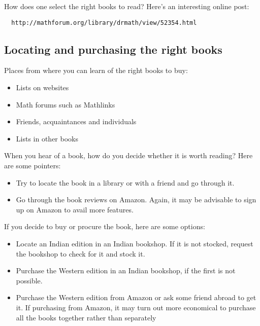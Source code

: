 \documentclass[a4paper]{amsart}
\begin{document}
How does one select the right books to read? Here's an interesting online post:

\begin{verbatim}
  http://mathforum.org/library/drmath/view/52354.html
\end{verbatim}

\subsection{Locating and purchasing the right books}

Places from where you can learn of the right books to buy:

\begin{itemize}

\item Lists on websites

\item Math forums such as Mathlinks

\item Friends, acquaintances and individuals

\item Lists in other books

\end{itemize}

When you hear of a  book, how do you decide whether it is worth reading? Here are some pointers:

\begin{itemize}

\item Try to locate the book in a library or with a friend and go through it.

\item Go through the book reviews on Amazon. Again, it may be advisable to sign up on Amazon to avail more features.

\end{itemize}

If you decide to buy or procure the book, here are some options:

\begin{itemize}

\item Locate an Indian edition in an Indian bookshop. If it is not stocked, request the bookshop to check for it and stock it.

\item Purchase the Western edition in an Indian bookshop, if the first is not possible.

\item Purchase the Western edition from Amazon or ask some friend abroad to get it. If purchasing from Amazon, it may turn out more
  economical to purchase all the books together rather than separately

\end{itemize}
\end{document}
